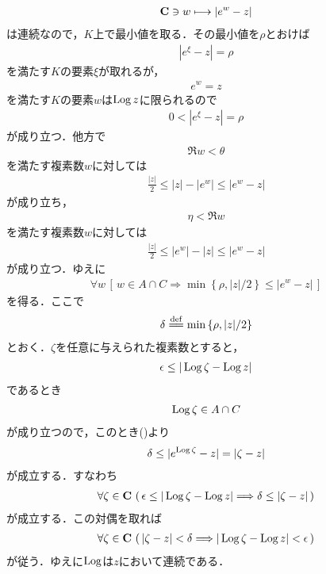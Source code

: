 \begin{sketch}
\begin{description}
\begin{align}
					\mathbf{C} \ni w \longmapsto |e^{w} - z|
				\end{align}
				は連続なので，$K$上で最小値を取る．その最小値を$\rho$とおけば
				\begin{align}
					|e^{\xi} - z| = \rho
				\end{align}
				を満たす$K$の要素$\xi$が取れるが，
				\begin{align}
					e^{w} = z
				\end{align}
				を満たす$K$の要素$w$は$\operatorname{Log}{z}$に限られるので
				\begin{align}
					0 < |e^{\xi} - z| = \rho
				\end{align}
				が成り立つ．他方で
				\begin{align}
					\Re{w} < \theta
				\end{align}
				を満たす複素数$w$に対しては
				\begin{align}
					\frac{|z|}{2} \leq |z| - |e^{w}| \leq |e^{w} - z|
				\end{align}
				が成り立ち，
				\begin{align}
					\eta < \Re{w}
				\end{align}
				を満たす複素数$w$に対しては
				\begin{align}
					\frac{|z|}{2} \leq |e^{w}| - |z| \leq |e^{w} - z|
				\end{align}
				が成り立つ．ゆえに
				\begin{align}
					\forall w\,
					\left[\, w \in A \cap C \Longrightarrow 
					\min\left\{\rho,|z|/2\right\} \leq |e^{w} - z|\, \right]
					\label{fom:thm_pv_log_is_holomorphic}
				\end{align}
				を得る．ここで
				\begin{align}
					\delta \defeq \min\left\{\rho,|z|/2\right\}
				\end{align}
				とおく．$\zeta$を任意に与えられた複素数とすると，
				\begin{align}
					\epsilon \leq |\operatorname{Log}{\zeta} - \operatorname{Log}{z}|
				\end{align}
				であるとき
				\begin{align}
					\operatorname{Log}{\zeta} \in A \cap C
				\end{align}
				が成り立つので，このとき()より
				\begin{align}
					\delta \leq |e^{\operatorname{Log}{\zeta}} - z| = |\zeta - z|
				\end{align}
				が成立する．すなわち
				\begin{align}
					\forall \zeta \in \mathbf{C}\, \left(\,
					\epsilon \leq |\operatorname{Log}{\zeta} - \operatorname{Log}{z}| 
					\Longrightarrow \delta \leq |\zeta - z|\, \right)
				\end{align}
				が成立する．この対偶を取れば
				\begin{align}
					\forall \zeta \in \mathbf{C}\, \left(\,
					|\zeta - z| < \delta \Longrightarrow |\operatorname{Log}{\zeta} - \operatorname{Log}{z}| < \epsilon\, \right)
				\end{align}
				が従う．ゆえに$\operatorname{Log}$は$z$において連続である．
				

\end{description}
\end{sketch}
